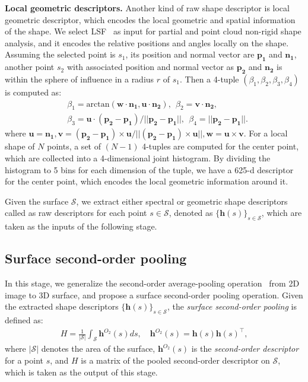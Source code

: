 \documentclass[runningheads]{llncs}
\begin{document}
\noindent
\textbf{Local geometric descriptors.} 
Another kind of raw shape descriptor is local geometric descriptor, which encodes the local geometric and spatial information of the shape. We select LSF~\cite{Ohkita2012Non} as input for partial and point cloud non-rigid shape analysis, and it encodes the relative positions and angles  locally on the shape. Assuming the selected point is $s_1$, its position and normal vector are $\mathbf{p_1}$ and $\mathbf{n_1}$,  another point $s_2$ with associated position and normal vector as $\mathbf{p_2}$ and $\mathbf{n_2}$  is within the sphere of influence in a radius $r$ of $s_1$. Then a 4-tuple $(\beta_1, \beta_2, \beta_3, \beta_4)$ is computed as:
\begin{equation}
\begin{split}
&\beta_1 = \text{arctan}(\mathbf{w}\cdot{\mathbf{n_1}},\mathbf{u}\cdot{\mathbf{n_2}}),~~\beta_2 = \mathbf{v}\cdot{\mathbf{n_2}}, \\
&\beta_3 = \mathbf{u} \cdot{(\mathbf{p_2}-\mathbf{p_1})/||\mathbf{p_2}-\mathbf{p_1}||},~~\beta_4 = ||\mathbf{p_2}-\mathbf{p_1}||.
\end{split}
\end{equation}
where $\mathbf{u} = \mathbf{n_1}, \mathbf{v} = (\mathbf{p_2}-\mathbf{p_1})\times \mathbf{u}/||(\mathbf{p_2}-\mathbf{p_1})\times \mathbf{u}||, \mathbf{w} = \mathbf{u}\times \mathbf{v} $. For a local shape of $N$ points, a set of $(N-1)$ 4-tuples are computed for the center point, which are collected into a 4-dimensional joint histogram. By dividing the histogram to 5 bins for each dimension of the tuple, we have a 625-d descriptor for the center point, which encodes the local geometric information around it. 
 
Given the surface $\mathcal{S}$, we extract either spectral or geometric shape descriptors  called as raw descriptors for each point $s \in \mathcal{S}$, denoted as $\{\mathbf{h}(s)\}_{s \in \mathcal{S}}$, which are taken as the inputs of the following stage.

\subsection{Surface second-order pooling}
In this stage, we generalize the second-order average-pooling operation~\cite{Carreira} from 2D image to 3D surface, and propose a surface second-order pooling operation. Given the extracted shape descriptors $\{\mathbf{h}(s)\}_{s \in \mathcal{S}}$, the \emph{surface second-order pooling} is defined as: 
\begin{eqnarray}
H = \frac{1}{|{\mathcal{S}}|}\int_{{\mathcal{S}}}\mathbf{h}^{O_2}(s)ds,  \quad
  \mathbf{h}^{O_2}(s) = \mathbf{h}(s) \mathbf{h}(s)^\top,
\label{eqn:2p}
\end{eqnarray}
where $|{\mathcal{S}}|$ denotes the area of the surface, $\mathbf{h}^{O_2}(s)$ is the \emph{second-order descriptor} for a point $s$, and $H$ is a matrix of the pooled second-order descriptor on ${\mathcal{S}}$, which is taken as the output of this stage. 
\end{document}
